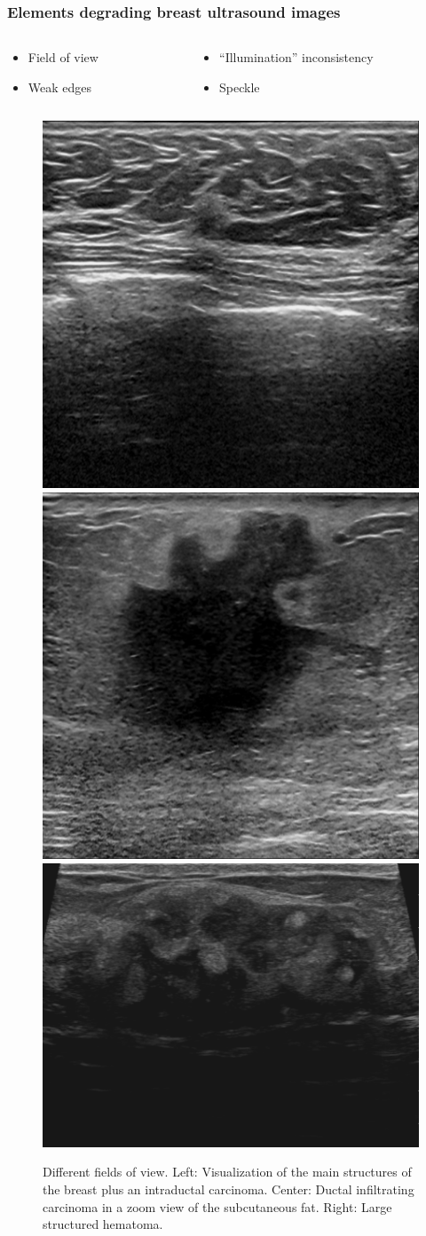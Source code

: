 \begin{frame}\frametitle{Elements degrading breast ultrasound images}
\begin{columns}
\begin{column}{.3\textwidth}
\begin{itemize}
\item<+> Field of view
\item<1-> Weak edges
\end{itemize}
\end{column}
\begin{column}{.5\textwidth}
\begin{itemize}
\item<+> ``Illumination'' inconsistency
\item<+> Speckle
\end{itemize}
\end{column}
\end{columns}	

\begin{overprint}
		\vspace{15pt}
		\begin{figure} 
		\includegraphics[height=.28\textwidth]{sono/anon1704_9_1_CID}\hspace{1pt}
		\includegraphics[height=.28\textwidth]{sono/a110105_096_CDI}\hspace{1pt}
		\includegraphics[height=.28\textwidth]{sono/anon0101_0_3_H}
		\caption{Different fields of view. Left: Visualization of the main structures of the breast plus an intraductal carcinoma. Center: Ductal infiltrating carcinoma in a zoom view of the subcutaneous fat. Right: Large structured hematoma.}
		\end{figure}	


\end{overprint}
\end{frame}
